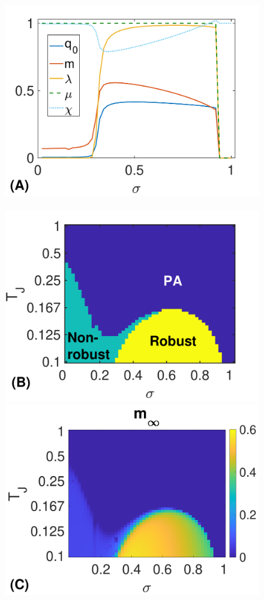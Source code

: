 \documentclass[%
 reprint,
superscriptaddress,
 amsmath,amssymb,
 prl,
]{revtex4-2}
\begin{document}
\begin{figure}
\includegraphics[scale=0.23]{fig1a.pdf}\,\,
\includegraphics[scale=0.23]{fig2b-eps-converted-to.pdf}
\includegraphics[scale=0.215]{fig2c.pdf}

\end{figure}
\end{document}
